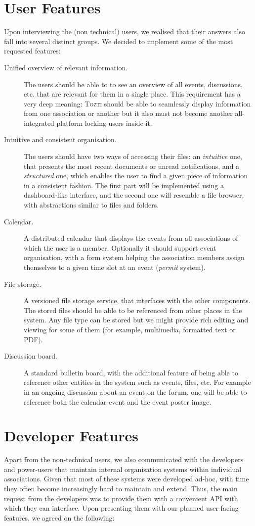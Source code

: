 \documentclass[a4paper, english]{report}
\newcommand{\tozti}{\textsc{Tozti}\xspace}
\begin{document}
\section{User Features}
Upon interviewing the (non technical) users, we realised that their answers also fall into several distinct groups. We decided to implement some of the most requested features:
\begin{description}
	\item[Unified overview of relevant information.] The users should be able to to see an overview of all events, discussions, etc. that are relevant for them in a single place. This requirement has a very deep meaning: \tozti should be able to seamlessly display information from one association or another but it also must not become another all-integrated platform locking users inside it.
    \item[Intuitive and consistent organisation.] The users should have two ways of accessing their files: an \emph{intuitive} one, that presents the most recent documents or unread notifications, and a \emph{structured} one, which enables the user to find a given piece of information in a consistent fashion. The first part will be implemented using a dashboard-like interface, and the second one will resemble a file browser, with abstractions similar to files and folders.
    \item[Calendar.] A distributed calendar that displays the events from all associations of which the user is a member. Optionally it should support event organisation, with a form system helping the association members assign themselves to a given time slot at an event (\emph{permit} system).
    \item[File storage.] A versioned file storage service, that interfaces with the other components. The stored files should be able to be referenced from other places in the system. Any file type can be stored but we might provide rich editing and viewing for some of them (for example, multimedia, formatted text or PDF).
    \item[Discussion board.] A standard bulletin board, with the additional feature of being able to reference other entities in the system such as events, files, etc. For example in an ongoing discussion about an event on the forum, one will be able to reference both the calendar event and the event poster image.
\end{description}

\section{Developer Features}
Apart from the non-technical users, we also communicated with the developers and power-users that maintain internal organisation systems within individual associations. Given that most of these systems were developed ad-hoc, with time they often become increasingly hard to maintain and extend. Thus, the main request from the developers was to provide them with a convenient API with which they can interface. Upon presenting them with our planned user-facing features, we agreed on the following:
\end{document}

